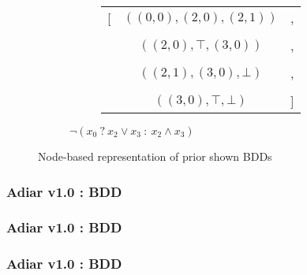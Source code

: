 \documentclass[english, aspectratio=169]{beamer}
\begin{document}
\begin{frame}
\begin{figure}
\begin{subfigure}{0.49\linewidth}
      \begin{subfigure}[b]{0.33\linewidth}
        \centering
        \begin{tikzpicture}[scale=0.6, every node/.style={transform shape}]
          
        \end{tikzpicture}
      \end{subfigure}
      \begin{subfigure}[b]{0.55\linewidth}
        \centering
        { \tiny
          \begin{tabular}{r c l}
            [ & $((0,0), (2,0), (2,1))$ & ,
            \\ \\
              & $((2,0), \top, (3,0))$ & ,
            \\ \\
              & $((2,1), (3,0), \bot)$   & ,
            \\ \\
              & $((3,0), \top, \bot)$   & ]
          \end{tabular}
          \vspace{10pt}
        }
      \end{subfigure}

      \caption{$\neg (x_0 \ ?\ x_2 \vee x_3 \ :\ x_2 \wedge x_3)$}
    \end{subfigure}

    \caption{Node-based representation of prior shown BDDs}
  \end{figure}

\end{frame}

\begin{frame}
  \frametitle{Adiar v1.0 : BDD}


  
\end{frame}

\begin{frame}
  \frametitle{Adiar v1.0 : BDD}

  
\end{frame}

\begin{frame}
  \frametitle{Adiar v1.0 : BDD}

  
\end{frame}

\end{document}

